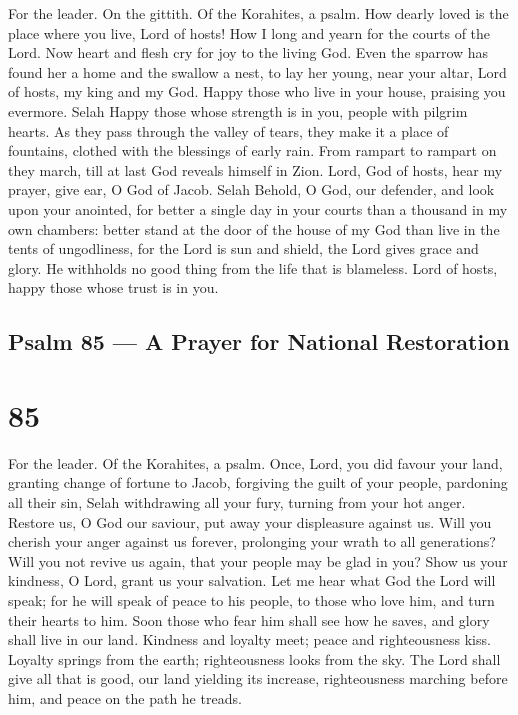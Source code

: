 For the leader. On the gittith. Of the Korahites, a psalm. 
How dearly loved is the place where you live, Lord of hosts!
 How I long and yearn for the courts of the Lord. Now heart
and flesh cry for joy to the living God.  Even the sparrow
has found her a home and the swallow a nest, to lay her young, near your
altar, Lord of hosts, my king and my God.  Happy those who
live in your house, praising you evermore. Selah  Happy
those whose strength is in you, people with pilgrim hearts. 
As they pass through the valley of tears, they make it a place of
fountains, clothed with the blessings of early rain.  From
rampart to rampart on they march, till at last God reveals himself in
Zion.  Lord, God of hosts, hear my prayer, give ear, O God
of Jacob. Selah  Behold, O God, our defender, and look upon
your anointed,  for better a single day in your courts than
a thousand in my own chambers: better stand at the door of the house of
my God than live in the tents of ungodliness,  for the Lord
is sun and shield, the Lord gives grace and glory. He withholds no good
thing from the life that is blameless.  Lord of hosts,
happy those whose trust is in you.

\hypertarget{psalm-85-a-prayer-for-national-restoration}{%
\subsection{Psalm 85 --- A Prayer for National
Restoration}\label{psalm-85-a-prayer-for-national-restoration}}

\hypertarget{section-84}{%
\section{85}\label{section-84}}

For the leader. Of the Korahites, a psalm.  Once, Lord, you
did favour your land, granting change of fortune to Jacob, 
forgiving the guilt of your people, pardoning all their sin, Selah
 withdrawing all your fury, turning from your hot anger.
 Restore us, O God our saviour, put away your displeasure
against us.  Will you cherish your anger against us forever,
prolonging your wrath to all generations?  Will you not
revive us again, that your people may be glad in you?  Show
us your kindness, O Lord, grant us your salvation.  Let me
hear what God the Lord will speak; for he will speak of peace to his
people, to those who love him, and turn their hearts to him.
 Soon those who fear him shall see how he saves, and glory
shall live in our land.  Kindness and loyalty meet; peace
and righteousness kiss.  Loyalty springs from the earth;
righteousness looks from the sky.  The Lord shall give all
that is good, our land yielding its increase, 
righteousness marching before him, and peace on the path he treads.

